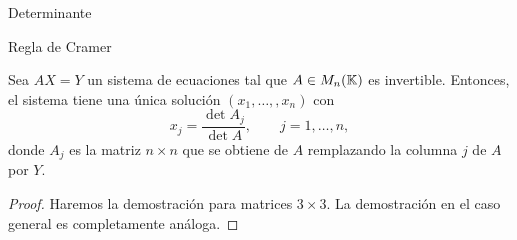 \begin{chapter}{Determinante}
\begin{section}{Regla de Cramer}
        
        
        \begin{teorema} Sea $AX=Y$ un sistema de ecuaciones tal que $A \in M_n(\mathbb K)$ es invertible. Entonces, el sistema tiene una única solución $(x_1,\ldots,,x_n)$ con 
            \begin{equation*}
            x_j = \frac{\det A_j}{\det A},\qquad j=1,\ldots,n,
            \end{equation*}
            donde $A_j$ es la matriz $n \times n$ que se obtiene de $A$ remplazando la columna $j$ de
            $A$ por $Y$.
        \end{teorema}
        \begin{proof}
            Haremos la demostración para matrices $3 \times 3$. La demostración en el caso general es completamente análoga. 
            

\end{proof}
\end{section}
\end{chapter}
